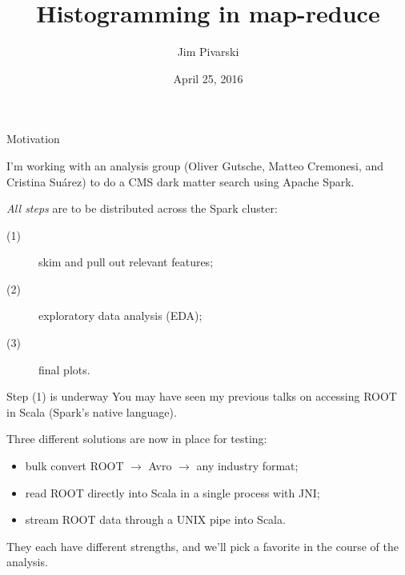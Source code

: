 \documentclass{beamer}
\title[2016-04-25-histogrammar]{Histogramming in map-reduce}
\author{Jim Pivarski}
\institute{Princeton University -- DIANA}
\date{April 25, 2016}
\begin{document}
\begin{frame}
  \titlepage
\end{frame}


\begin{frame}{Motivation}

I'm working with an analysis group (Oliver Gutsche, Matteo Cremonesi, and Cristina Su\'arez) to do a CMS dark matter search using Apache Spark.

\vspace{0.5 cm}
{\it All steps} are to be distributed across the Spark cluster:

\begin{description}
\item[(1)] skim and pull out relevant features;
\item[(2)] exploratory data analysis (EDA);
\item[(3)] final plots.
\end{description}

\end{frame}

\begin{frame}{Step (1) is underway}
You may have seen my previous talks on accessing ROOT in Scala (Spark's native language).

\vspace{0.5 cm}
Three different solutions are now in place for testing:

\begin{itemize}
\item bulk convert ROOT $\to$ Avro $\to$ any industry format;
\item read ROOT directly into Scala in a single process with JNI;
\item stream ROOT data through a UNIX pipe into Scala.
\end{itemize}

\vspace{0.5 cm}
They each have different strengths, and we'll pick a favorite in the course of the analysis.
\end{frame}
\end{document}

